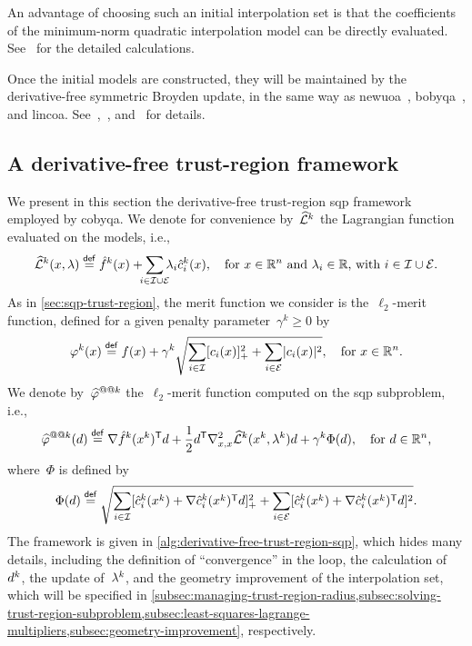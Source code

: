 An advantage of choosing such an initial interpolation set is that the coefficients of the minimum-norm quadratic interpolation model can be directly evaluated.
See~\cite[\S~9]{Powell_2009} for the detailed calculations.

Once the initial models are constructed, they will be maintained by the derivative-free symmetric Broyden update, in the same way as \gls{newuoa}~\cite{Powell_2006}, \gls{bobyqa}~\cite{Powell_2009}, and \gls{lincoa}.
See~\cite{Powell_2004b,Powell_2004c},~\cite[\S~4]{Powell_2006}, and~\cite[\S~4]{Powell_2009} for details.

\subsection{A derivative-free trust-region  framework}

We present in this section the derivative-free trust-region \gls{sqp} framework employed by \gls{cobyqa}.
We denote for convenience by~$\lagm[k]$ the Lagrangian function evaluated on the models, i.e.,
\begin{equation*}
    \lagm[k](\iter, \lm) \eqdef \objm[k](\iter) + \sum_{\mathclap{i \in \iub \cup \ieq}} \lm_i \conm[k]{i}(\iter), \quad \text{for~$\iter \in \R^n$ and~$\lm_i \in \R$, with~$i \in \iub \cup \ieq$.}
\end{equation*}
As in \cref{sec:sqp-trust-region}, the merit function we consider is the~$\ell_2$-merit function, defined for a given penalty parameter~$\gamma^k \ge 0$ by
\begin{equation*}
    \merit[k](\iter) \eqdef \obj(x) + \gamma^k \sqrt{\sum_{i \in \iub} \posp{\con{i}(\iter)}^2 + \sum_{i \in \ieq} \abs{\con{i}(\iter)}^2}, \quad \text{for~$\iter \in \R^n$.}
\end{equation*}
We denote by~$\meritm[k]$ the~$\ell_2$-merit function computed on the \gls{sqp} subproblem, i.e.,
\begin{equation}
    \label{eq:l2-merit-function-model}
    \meritm[k](\step) \eqdef \nabla \objm[k](\iter[k])^{\T} \step + \frac{1}{2} \step^{\T} \nabla_{x, x}^2 \lagm[k](\iter[k], \lm[k]) \step + \gamma^k \Phi(\step), \quad \text{for~$\step \in \R^n$,}
\end{equation}
where~$\Phi$ is defined by
\begin{equation}
    \label{eq:l2-merit-function-model-penalty}
    \Phi(d) \eqdef \sqrt{\sum_{i \in \iub} \posp{\conm[k]{i}(\iter[k]) + \nabla \conm[k]{i}(\iter[k])^{\T} \step}^2 + \sum_{i \in \ieq} [\conm[k]{i}(\iter[k]) + \nabla \conm[k]{i}(\iter[k])^{\T} \step]^2}.
\end{equation}
The framework is given in \cref{alg:derivative-free-trust-region-sqp}, which hides many details, including the definition of \enquote{convergence} in the loop, the calculation of~$\step[k]$, the update of~$\lm[k]$, and the geometry improvement of the interpolation set, which will be specified in \cref{subsec:managing-trust-region-radius,subsec:solving-trust-region-subproblem,subsec:least-squares-lagrange-multipliers,subsec:geometry-improvement}, respectively.

